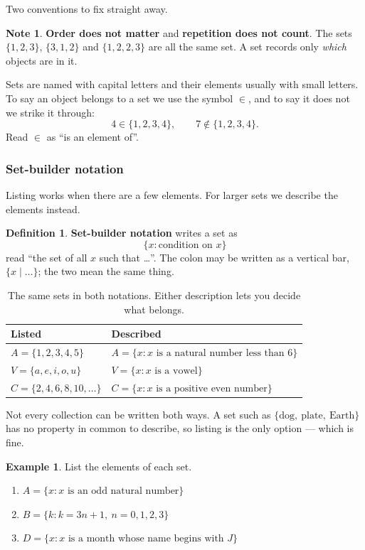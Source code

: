 \documentclass[11pt,a4paper]{article}
\theoremstyle{definition}
\newtheorem{definition}[thm]{Definition}
\newtheorem{example}[thm]{Example}
\newtheorem{note}[thm]{Note}
\begin{document}
Two conventions to fix straight away.

\begin{note}
\textbf{Order does not matter} and \textbf{repetition does not count}. The sets
$\{1,2,3\}$, $\{3,1,2\}$ and $\{1,2,2,3\}$ are all the same set. A set records only
\emph{which} objects are in it.
\end{note}

Sets are named with capital letters and their elements usually with small letters.
To say an object belongs to a set we use the symbol $\in$, and to say it does not we
strike it through:
$$4\in\{1,2,3,4\},\qquad 7\notin\{1,2,3,4\}.$$
Read $\in$ as ``is an element of''.

\subsubsection{Set-builder notation}

Listing works when there are a few elements. For larger sets we describe the
elements instead.

\begin{definition}
\textbf{Set-builder notation} writes a set as
$$\{x : \text{condition on } x\}$$
read ``the set of all $x$ such that \dots''. The colon may be written as a vertical
bar, $\{x \mid \dots\}$; the two mean the same thing.
\end{definition}

\begin{table}[H]
\centering
\begin{tabular}{|l|l|}
\hline
Listed & Described\\
\hline
$A=\{1,2,3,4,5\}$ & $A=\{x : x \text{ is a natural number less than } 6\}$\\
$V=\{a,e,i,o,u\}$ & $V=\{x : x \text{ is a vowel}\}$\\
$C=\{2,4,6,8,10,\ldots\}$ & $C=\{x : x \text{ is a positive even number}\}$\\
\hline
\end{tabular}
\caption{The same sets in both notations. Either description lets you decide what belongs.}
\end{table}

Not every collection can be written both ways. A set such as
$\{\text{dog},\ \text{plate},\ \text{Earth}\}$ has no property in common to describe,
so listing is the only option --- which is fine.

\begin{example}
List the elements of each set.
\begin{enumerate}
\item[(a).] $A=\{x : x \text{ is an odd natural number}\}$
\item[(b).] $B=\{k : k=3n+1,\ n=0,1,2,3\}$
\item[(c).] $D=\{x : x \text{ is a month whose name begins with } J\}$
\end{enumerate}
\end{example}
\end{document}
